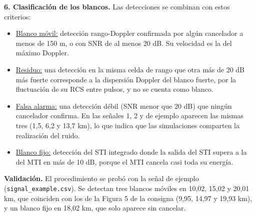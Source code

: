 \textbf{6. Clasificación de los blancos.} Las detecciones se combinan con estos criterios:
\begin{itemize}
    \item \underline{Blanco móvil:} detección rango-Doppler confirmada por algún cancelador a menos de 150 m, o con SNR de al menos 20 dB. Su velocidad es la del máximo Doppler.
    \item \underline{Residuo:} una detección en la misma celda de rango que otra más de 20 dB más fuerte corresponde a la dispersión Doppler del blanco fuerte, por la fluctuación de su RCS entre pulsos, y no se cuenta como blanco.
    \item \underline{Falsa alarma:} una detección débil (SNR menor que 20 dB) que ningún cancelador confirma. En las señales 1, 2 y de ejemplo aparecen las mismas tres (1,5, 6,2 y 13,7 km), lo que indica que las simulaciones comparten la realización del ruido.
    \item \underline{Blanco fijo:} detección del STI integrado donde la salida del STI supera a la del MTI en más de 10 dB, porque el MTI cancela casi toda su energía.
\end{itemize}

\textbf{Validación.} El procedimiento se probó con la señal de ejemplo (\texttt{signal\_example.csv}). Se detectan tres blancos móviles en 10,02, 15,02 y 20,01 km, que coinciden con los de la Figura 5 de la consigna (9,95, 14,97 y 19,93 km), y un blanco fijo en 18,02 km, que solo aparece sin cancelar.
